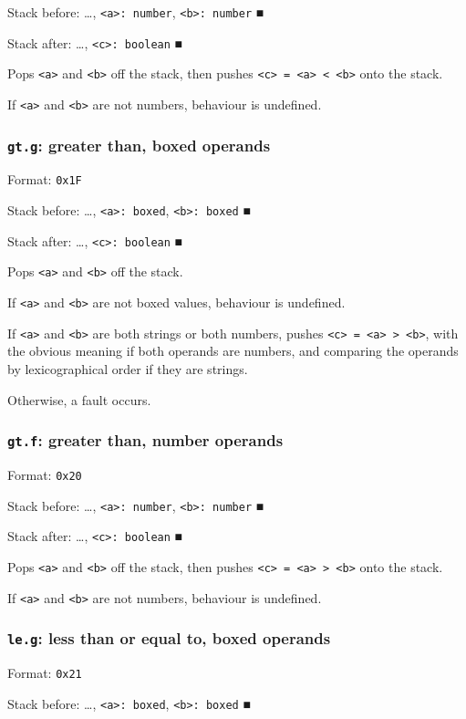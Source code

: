\documentclass[11pt]{article}
\begin{document}
Stack before: \ldots{}​, \texttt{<a>: number}, \texttt{<b>: number} ■

Stack after: \ldots{}​, \texttt{<c>: boolean} ■

Pops \texttt{<a>} and \texttt{<b>} off the stack, then pushes \texttt{<c> = <a> < <b>} onto
the stack.

If \texttt{<a>} and \texttt{<b>} are not numbers, behaviour is undefined.

\subsubsection{\texttt{gt.g}: greater than, boxed operands}
\label{sec:orge89bbc6}
Format: \texttt{0x1F}

Stack before: \ldots{}​, \texttt{<a>: boxed}, \texttt{<b>: boxed} ■

Stack after: \ldots{}​, \texttt{<c>: boolean} ■

Pops \texttt{<a>} and \texttt{<b>} off the stack.

If \texttt{<a>} and \texttt{<b>} are not boxed values, behaviour is undefined.

If \texttt{<a>} and \texttt{<b>} are both strings or both numbers, pushes
\texttt{<c> = <a> > <b>}, with the obvious meaning if both operands are
numbers, and comparing the operands by lexicographical order if they are
strings.

Otherwise, a fault occurs.

\subsubsection{\texttt{gt.f}: greater than, number operands}
\label{sec:org3ea3931}
Format: \texttt{0x20}

Stack before: \ldots{}​, \texttt{<a>: number}, \texttt{<b>: number} ■

Stack after: \ldots{}​, \texttt{<c>: boolean} ■

Pops \texttt{<a>} and \texttt{<b>} off the stack, then pushes \texttt{<c> = <a> > <b>} onto
the stack.

If \texttt{<a>} and \texttt{<b>} are not numbers, behaviour is undefined.

\subsubsection{\texttt{le.g}: less than or equal to, boxed operands}
\label{sec:orgf9e2550}
Format: \texttt{0x21}

Stack before: \ldots{}​, \texttt{<a>: boxed}, \texttt{<b>: boxed} ■
\end{document}
